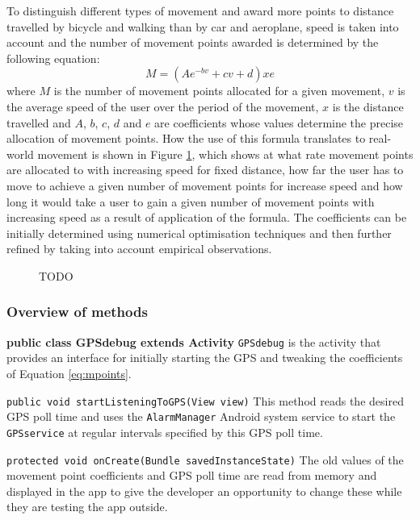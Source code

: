 \documentclass[12pt,a4paper,twoside]{article}
\begin{document}
To distinguish different types of movement and award more points to distance travelled by bicycle and walking than by car and aeroplane, speed is taken into account and the number of movement points awarded is determined by the following equation:
\begin{equation}
\label{eq:mpoints}
M = \left({Ae^{-bv}+cv+d}\right)xe
\end{equation}
where $M$ is the number of movement points allocated for a given movement, $v$ is the average speed of the user over the period of the movement, $x$ is the distance travelled and $A$, $b$, $c$, $d$ and $e$ are coefficients whose values determine the precise allocation of movement points. How the use of this formula translates to real-world movement is shown in Figure \ref{fig:movementeqn}, which shows at what rate movement points are allocated to with increasing speed for fixed distance, how far the user has to move to achieve a given number of movement points for increase speed and how long it would take a user to gain a given number of movement points with increasing speed as a result of application of the formula. The coefficients can be initially determined using numerical optimisation techniques and then further refined by taking into account empirical observations.

\begin{figure}
\label{fig:movementeqn}

\caption{TODO}
\end{figure}

\subsubsection{Overview of methods}
\large{\textbf{public class GPSdebug extends Activity}}\newline
\verb=GPSdebug= is the activity that provides an interface for initially starting the GPS and tweaking the coefficients of Equation \ref{eq:mpoints}.

\verb=public void startListeningToGPS(View view)=\newline
This method reads the desired GPS poll time and uses the \verb=AlarmManager= Android system service to start the \verb=GPSservice= at regular intervals specified by this GPS poll time.

\verb=protected void onCreate(Bundle savedInstanceState)=\newline
The old values of the movement point coefficients and GPS poll time are read from memory and displayed in the app to give the developer an opportunity to change these while they are testing the app outside.
\end{document}
